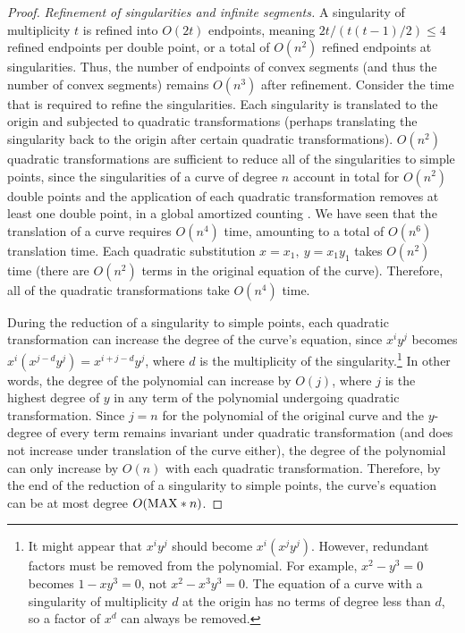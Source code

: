 \begin{proof}
{\em Refinement of singularities and infinite segments.}
%
A singularity of multiplicity $t$ is refined into $O(2t)$ endpoints, meaning
$2t / (t(t-1) / 2) \leq 4$ refined endpoints per double point,
or a total of $O(n^{2})$ refined endpoints at singularities.
Thus, the number of endpoints of convex segments 
(and thus the number of convex segments) remains $O(n^{3})$ 
after refinement.
Consider the time that is required to refine the singularities.
Each singularity is translated to the origin and subjected to 
quadratic transformations
(perhaps translating the singularity back to the origin after certain 
quadratic 
transformations).
$O(n^{2})$ quadratic transformations are sufficient to reduce all of 
the singularities 
to simple points, since the singularities of a curve of degree $n$ 
account in total for 
$O(n^{2})$ double points and the application of each 
quadratic transformation 
removes at least one double point, in a global amortized counting 
\cite{abba3}. 
We have seen that the translation of a curve requires $O(n^{4})$ time, 
amounting to a total of $O(n^{6})$ translation time. 
Each quadratic substitution $x = x_{1},\ y = x_{1}y_{1}$ takes 
$O(n^{2})$ time 
(there are $O(n^2)$ terms in the original equation of the curve).
Therefore, all of the quadratic transformations take $O(n^{4})$ time.

During the reduction of a singularity to simple points, each quadratic
transformation can increase the degree of the curve's equation, since
$x^{i}y^{j}$ becomes $x^{i}(x^{j-d}y^{j}) = x^{i+j-d}y^{j}$, where $d$ 
is the 
multiplicity of the singularity.\footnote{It might appear that 
	$x^{i}y^{j}$ should become $x^{i}(x^{j}y^{j})$.  However,  
	redundant factors must be removed from the polynomial.
	For example, $x^{2} - y^{3} = 0$
	becomes $1-xy^{3} = 0$, not $x^{2} - x^{3}y^{3} = 0$.
	The equation of a curve with a singularity of multiplicity $d$ 
	at the origin has no terms of degree less than $d$, so a factor 
	of $x^{d}$ can
	always be removed.}
In other words, the degree of the polynomial can increase by $O(j)$, where
$j$ is the highest degree of $y$ in any term of the polynomial undergoing 
quadratic transformation. 
Since $j=n$ for the polynomial of the original curve and the $y$-degree 
of every term
remains invariant under quadratic transformation (and does not increase 
under
translation of the curve either), the degree of the polynomial can only 
increase
by $O(n)$ with each quadratic transformation.
Therefore, by the end of the reduction of a singularity to simple points, 
the curve's equation can be at most degree $O({\rm MAX} * n)$.


\end{proof}
